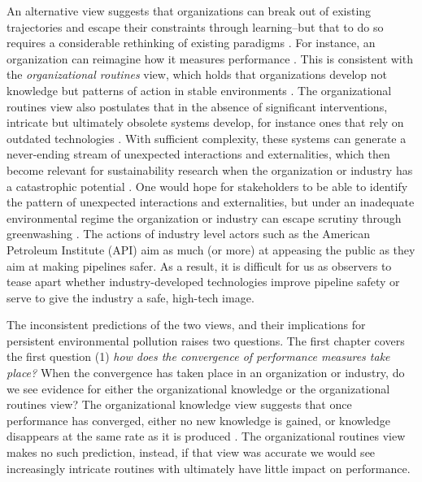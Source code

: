 An alternative view suggests that organizations can break out of existing trajectories and escape their constraints through learning--but that to do so requires a considerable rethinking of existing paradigms \citep{March2010}. For instance, an organization can reimagine how it measures performance \citep{Argyris1978}. This is consistent with the \textit{organizational routines} view, which holds that organizations develop not knowledge but patterns of action in stable environments \citep{Bingham2011}. The organizational routines view also postulates that in the absence of significant interventions, intricate but ultimately obsolete systems develop, for instance ones that rely on outdated technologies \citep{March1991}. With sufficient complexity, these systems can generate a never-ending stream of unexpected interactions and externalities, which then become relevant for sustainability research when the organization or industry has a catastrophic potential \citep{Perrow1984, Beck1992}. One would hope for stakeholders to be able to identify the pattern of unexpected interactions and externalities, but under an inadequate environmental regime the organization or industry can escape scrutiny through greenwashing \citep{Lyon2015}. The actions of industry level actors such as the American Petroleum Institute (API) aim as much (or more) at appeasing the public as they aim at making pipelines safer. As a result, it is difficult for us as observers to tease apart whether industry-developed technologies improve pipeline safety or serve to give the industry a safe, high-tech image.

The inconsistent predictions of the two views, and their implications for persistent environmental pollution raises two questions. The first chapter covers the first question (1) \textit{how does the convergence of performance measures take place?} When the convergence has taken place in an organization or industry, do we see evidence for either the organizational knowledge or the organizational routines view? The organizational knowledge view suggests that once performance has converged, either no new knowledge is gained, or knowledge disappears at the same rate as it is produced \citep{Argote2013-3}. The organizational routines view makes no such prediction, instead, if that view was accurate we would see increasingly intricate routines with ultimately have little impact on performance. 

